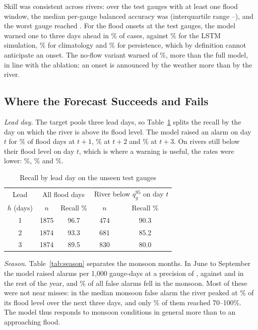 \documentclass[conference]{IEEEtran}
\begin{document}
Skill was consistent across rivers: over the \PgN{} test gauges with at least one flood window, the median per-gauge balanced accuracy was \PgMed{} (interquartile range \PgQOne--\PgQThree), and the worst gauge reached \PgMin. For the \EvN{} flood onsets at the test gauges, the model warned one to three days ahead in \EvXgbWarn\% of cases, against \EvLstmWarn\% for the LSTM simulation, \EvClimWarn\% for climatology and \EvPersWarn\% for persistence, which by definition cannot anticipate an onset. The no-flow variant warned of \EvNoFlowWarn\%, more than the full model, in line with the ablation: an onset is announced by the weather more than by the river.

\subsection{Where the Forecast Succeeds and Fails}
\textit{Lead day.} The target pools three lead days, so Table~\ref{tab:lead} splits the recall by the day on which the river is above its flood level. The model raised an alarm on day $t$ for \LeadOne\% of flood days at $t{+}1$, \LeadTwo\% at $t{+}2$ and \LeadThree\% at $t{+}3$. On rivers still below their flood level on day $t$, which is where a warning is useful, the rates were lower: \LeadOneRise\%, \LeadTwoRise\% and \LeadThreeRise\%.

\begin{table}[t]
\caption{Recall by lead day on the unseen test gauges}
\label{tab:lead}
\centering
\footnotesize
\begin{tabular}{ccccc}
\toprule
Lead & \multicolumn{2}{c}{All flood days} & \multicolumn{2}{c}{River below $q^{95}_g$ on day $t$}\\
$h$ (days) & $n$ & Recall \% & $n$ & Recall \%\\
\midrule
1 & 1875 & 96.7 & 474 & 90.3\\
2 & 1874 & 93.3 & 681 & 85.2\\
3 & 1874 & 89.5 & 830 & 80.0\\
\bottomrule
\end{tabular}
\end{table}

\textit{Season.} Table~\ref{tab:season} separates the monsoon months. In June to September the model raised \MonAlarms{} alarms per 1,000 gauge-days at a precision of \MonPrec, against \OthAlarms{} and \OthPrec{} in the rest of the year, and \FpMonsoonPct\% of all false alarms fell in the monsoon. Most of these were not near misses: in the median monsoon false alarm the river peaked at \FaRatioMon\% of its flood level over the next three days, and only \NearMissMon\% of them reached 70--100\%. The model thus responds to monsoon conditions in general more than to an approaching flood.
\end{document}
